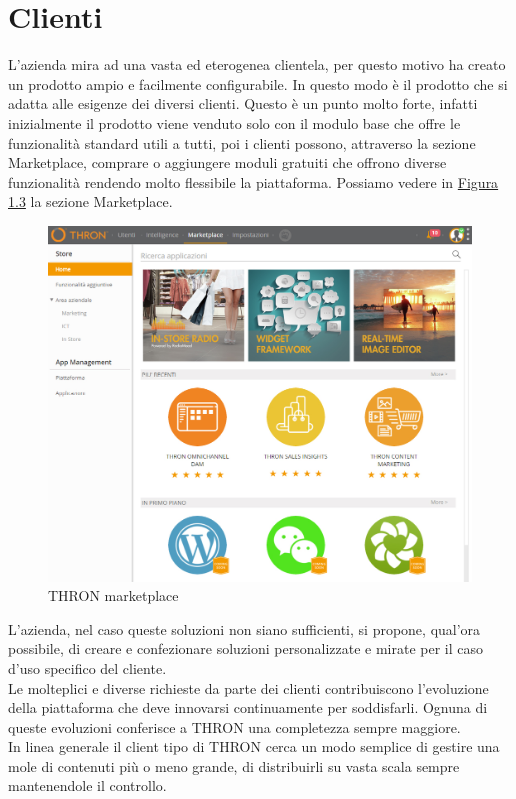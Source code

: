 \documentclass[a4paper, 12pt, twoside, openright]{book}
\begin{document}
\newpage{}
\section{Clienti}
L'azienda mira ad una vasta ed eterogenea clientela, per questo motivo ha creato un prodotto ampio e facilmente configurabile. In questo modo è il prodotto che si adatta alle esigenze dei diversi clienti. Questo è un punto molto forte, infatti inizialmente il prodotto viene venduto solo con il modulo base che offre le funzionalità standard utili a tutti, poi i clienti possono, attraverso la sezione Marketplace, comprare o aggiungere moduli gratuiti che offrono diverse funzionalità rendendo molto flessibile la piattaforma. Possiamo vedere in \hyperref[thron-marketplace]{Figura 1.3} la sezione Marketplace.
\begin{figure}[H]
	\centering
	\label{thron-marketplace}
	\includegraphics[width=1.0\textwidth]{images/thron-marketplace.jpg}
	\caption{THRON marketplace}
\end{figure}
L'azienda, nel caso queste soluzioni non siano sufficienti, si propone, qual'ora possibile, di creare e confezionare soluzioni personalizzate e mirate per il caso d'uso specifico del cliente.\\
Le molteplici e diverse richieste da parte dei clienti contribuiscono l'evoluzione della piattaforma che deve innovarsi continuamente per soddisfarli. Ognuna di queste evoluzioni conferisce a THRON una completezza sempre maggiore.\\
In linea generale il client tipo di THRON cerca un modo semplice di gestire una mole di contenuti più o meno grande, di distribuirli su vasta scala sempre mantenendole il controllo.\\
\end{document}
